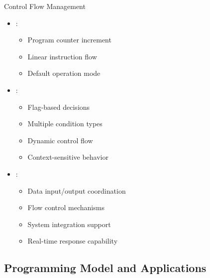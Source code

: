 \begin{frame}{Control Flow Management}
\begin{itemize}
\item {}:
\begin{itemize}
\item Program counter increment
\item Linear instruction flow
\item Default operation mode
\end{itemize}
\vspace{0.5cm}
\item {}:
\begin{itemize}
\item Flag-based decisions
\item Multiple condition types
\item Dynamic control flow
\item Context-sensitive behavior
\end{itemize}
\vspace{0.3cm}
\item {}:
\begin{itemize}
\item Data input/output coordination
\item Flow control mechanisms
\item System integration support
\item Real-time response capability
\end{itemize}
\end{itemize}
\end{frame}

\subsection{Programming Model and Applications}

